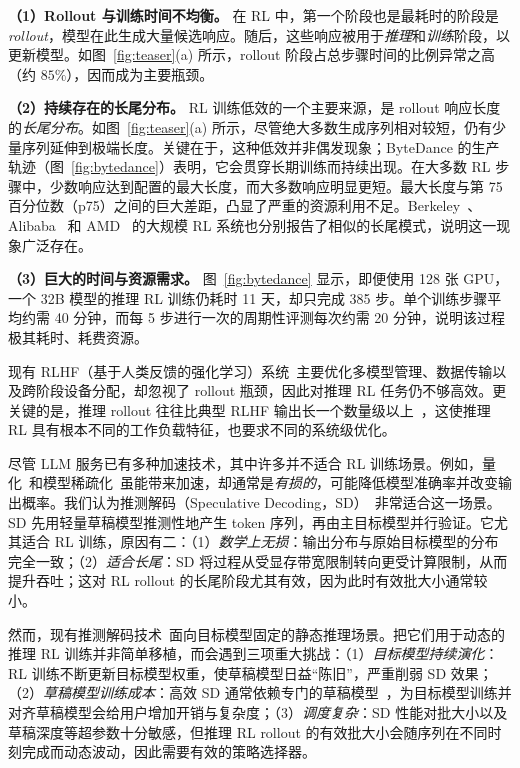 \documentclass[10pt,twocolumn]{article}
\begin{document}
\noindent\textbf{（1）Rollout 与训练时间不均衡。}
在 RL 中，第一个阶段也是最耗时的阶段是\emph{rollout}，模型在此生成大量候选响应。随后，这些响应被用于\emph{推理}和\emph{训练}阶段，以更新模型。如图~\ref{fig:teaser}(a) 所示，rollout 阶段占总步骤时间的比例异常之高（约 $85\%$），因而成为主要瓶颈。

\noindent\textbf{（2）持续存在的长尾分布。}
RL 训练低效的一个主要来源，是 rollout 响应长度的\emph{长尾分布}。如图~\ref{fig:teaser}(a) 所示，尽管绝大多数生成序列相对较短，仍有少量序列延伸到极端长度。关键在于，这种低效并非偶发现象；ByteDance 的生产轨迹（图~\ref{fig:bytedance}）表明，它会贯穿长期训练而持续出现。在大多数 RL 步骤中，少数响应达到配置的最大长度，而大多数响应明显更短。最大长度与第 75 百分位数（p75）之间的巨大差距，凸显了严重的资源利用不足。Berkeley~\cite{deepscalerTrace}、Alibaba~\cite{gao2025rollpacker} 和 AMD~\cite{zhou2025april} 的大规模 RL 系统也分别报告了相似的长尾模式，说明这一现象广泛存在。

\noindent\textbf{（3）巨大的时间与资源需求。}
图~\ref{fig:bytedance} 显示，即便使用 128 张 GPU，一个 32B 模型的推理 RL 训练仍耗时 11 天，却只完成 385 步。单个训练步骤平均约需 40 分钟，而每 5 步进行一次的周期性评测每次约需 20 分钟，说明该过程极其耗时、耗费资源。

现有 RLHF（基于人类反馈的强化学习）系统~\cite{HybridFlow,RLHFuse,ReaLHF,DeepSpeedChat,GEAR,NeMoAligner,FlexRLHF}主要优化多模型管理、数据传输以及跨阶段设备分配，却忽视了 rollout 瓶颈，因此对推理 RL 任务仍不够高效。更关键的是，推理 rollout 往往比典型 RLHF 输出长一个数量级以上~\cite{HybridFlow,RLHFuse,InstructGPT}，这使推理 RL 具有根本不同的工作负载特征，也要求不同的系统级优化。

尽管 LLM 服务已有多种加速技术，其中许多并不适合 RL 训练场景。例如，量化~\cite{AWQ,GPTQ}和模型稀疏化~\cite{LLM-Pruner,StreamingLLM}虽能带来加速，却通常是\emph{有损的}，可能降低模型准确率并改变输出概率。我们认为推测解码（Speculative Decoding，SD）~\cite{SpeculativeDecoding,chen2023accelerating}非常适合这一场景。SD 先用轻量草稿模型推测性地产生 token 序列，再由主目标模型并行验证。它尤其适合 RL 训练，原因有二：（1）\emph{数学上无损}：输出分布与原始目标模型的分布完全一致；（2）\emph{适合长尾}：SD 将过程从受显存带宽限制转向更受计算限制，从而提升吞吐；这对 RL rollout 的长尾阶段尤其有效，因为此时有效批大小通常较小。

然而，现有推测解码技术~\cite{Medusa,Eagle1,SpecInfer,HASS,Falcon,REST}面向目标模型固定的静态推理场景。把它们用于动态的推理 RL 训练并非简单移植，而会遇到三项重大挑战：（1）\emph{目标模型持续演化}：RL 训练不断更新目标模型权重，使草稿模型日益“陈旧”，严重削弱 SD 效果；（2）\emph{草稿模型训练成本}：高效 SD 通常依赖专门的草稿模型~\cite{HASS,Eagle1,Eagle2,Eagle3,Falcon,Hydra}，为目标模型训练并对齐草稿模型会给用户增加开销与复杂度；（3）\emph{调度复杂}：SD 性能对批大小以及草稿深度等超参数十分敏感，但推理 RL rollout 的有效批大小会随序列在不同时刻完成而动态波动，因此需要有效的策略选择器。
\end{document}
